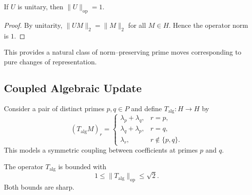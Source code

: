\documentclass[11pt]{article}
\begin{document}
\begin{proposition}
\label{prop:unitary-norm}
If $U$ is unitary, then $\|U\|_{\mathrm{op}} = 1$.
\end{proposition}

\begin{proof}
By unitarity, $\|U M\|_2 = \|M\|_2$ for all $M\in H$.
Hence the operator norm is $1$.
\end{proof}

This provides a natural class of norm–preserving prime moves corresponding to pure changes of representation.

\subsection{Coupled Algebraic Update}

Consider a pair of distinct primes $p,q\in P$ and define $T_{\mathrm{alg}}:H\to H$ by
\[
(T_{\mathrm{alg}} M)_r =
\begin{cases}
\lambda_p + \lambda_q, & r=p,\\
\lambda_q + \lambda_p, & r=q,\\
\lambda_r, & r\notin\{p,q\}.
\end{cases}
\]
This models a symmetric coupling between coefficients at primes $p$ and $q$.

\begin{proposition}
\label{prop:Talg-norm}
The operator $T_{\mathrm{alg}}$ is bounded with
\[
1 \leq \|T_{\mathrm{alg}}\|_{\mathrm{op}} \leq \sqrt{2}.
\]
Both bounds are sharp.
\end{proposition}
\end{document}
